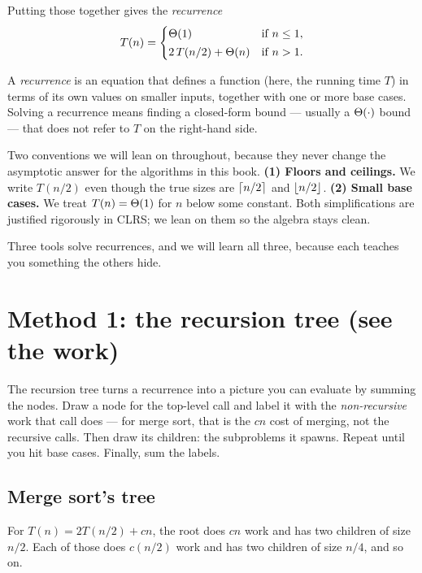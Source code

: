 Putting those together gives the \emph{recurrence}
\[
T(n) =
\begin{cases}
\Theta(1) & \text{if } n \le 1,\\[2pt]
2\,T(n/2) + \Theta(n) & \text{if } n > 1.
\end{cases}
\]

\begin{definition}[Recurrence]
A \emph{recurrence} is an equation that defines a function (here, the running time
$T$) in terms of its own values on smaller inputs, together with one or more base
cases. Solving a recurrence means finding a closed-form bound --- usually a
$\Theta(\cdot)$ bound --- that does not refer to $T$ on the right-hand side.
\end{definition}

\begin{focusbox}
Two conventions we will lean on throughout, because they never change the
asymptotic answer for the algorithms in this book.
\textbf{(1) Floors and ceilings.} We write $T(n/2)$ even though the true sizes are
$\lceil n/2\rceil$ and $\lfloor n/2\rfloor$. \textbf{(2) Small base cases.} We treat
$T(n)=\Theta(1)$ for $n$ below some constant. Both simplifications are justified
rigorously in CLRS; we lean on them so the algebra stays clean.
\end{focusbox}

Three tools solve recurrences, and we will learn all three, because
each teaches you something the others hide.

\section{Method 1: the recursion tree (see the work)}

The recursion tree turns a recurrence into a picture you can evaluate by summing the nodes.
Draw a node for the top-level call and label it with the \emph{non-recursive}
work that call does --- for merge sort, that is the $cn$ cost of merging, not the
recursive calls. Then draw its children: the subproblems it spawns. Repeat until
you hit base cases. Finally, sum the labels.

\subsection{Merge sort's tree}

For $T(n) = 2T(n/2) + cn$, the root does $cn$ work and has two children of size
$n/2$. Each of those does $c(n/2)$ work and has two children of size $n/4$, and so
on.

